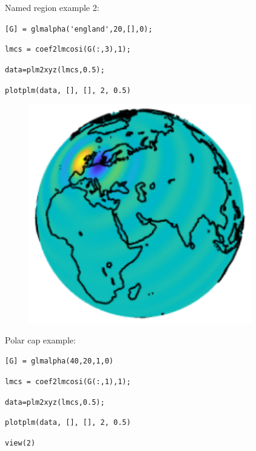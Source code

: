 \documentclass{article}
\begin{document}
\setlength{\parskip}{0.5cm plus4mm minus3mm}

Named region example 2:

\setlength{\parskip}{.1mm}

\verb![G] = glmalpha('england',20,[],0);!

\verb!lmcs = coef2lmcosi(G(:,3),1);!

\verb!data=plm2xyz(lmcs,0.5);!

\verb!plotplm(data, [], [], 2, 0.5)!

\begin{figure}[H]
\includegraphics[scale=1.2]{england_ex_2}
\end{figure}

\setlength{\parskip}{0.5cm plus4mm minus3mm}

Polar cap example:

\setlength{\parskip}{.1mm}

\verb![G] = glmalpha(40,20,1,0)!

\verb!lmcs = coef2lmcosi(G(:,1),1);!

\verb!data=plm2xyz(lmcs,0.5);!

\verb!plotplm(data, [], [], 2, 0.5)!

\verb!view(2)!
\end{document}
